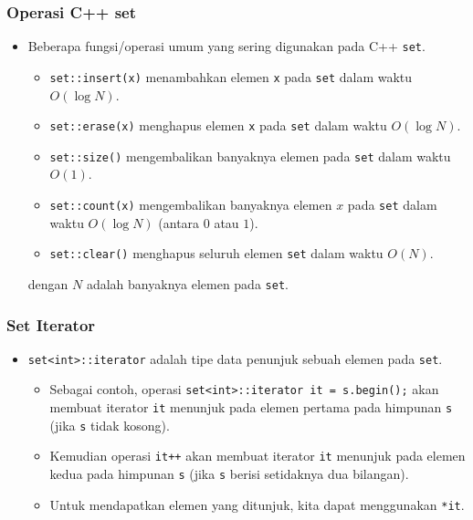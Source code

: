 \begin{frame}
\frametitle{Operasi C++ set}
\begin{itemize}
  \item Beberapa fungsi/operasi umum yang sering digunakan pada C++ \lstinline{set}.
  \begin{itemize}
    \item \lstinline{set::insert(x)} menambahkan elemen \lstinline{x} pada \lstinline{set} dalam waktu $O(\log N)$.
    \item \lstinline{set::erase(x)} menghapus elemen \lstinline{x} pada \lstinline{set} dalam waktu $O(\log N)$.
    \item \lstinline{set::size()} mengembalikan banyaknya elemen pada \lstinline{set} dalam waktu $O(1)$.
    \item \lstinline{set::count(x)} mengembalikan banyaknya elemen $x$ pada \lstinline{set} dalam waktu $O(\log N)$ (antara $0$ atau $1$).
    \item \lstinline{set::clear()} menghapus seluruh elemen \lstinline{set} dalam waktu $O(N)$.
  \end{itemize}
  dengan $N$ adalah banyaknya elemen pada \lstinline{set}.
\end{itemize}
\end{frame}

\begin{frame}
\frametitle{Set Iterator}
\begin{itemize}
  \item \lstinline{set<int>::iterator} adalah tipe data penunjuk sebuah elemen pada \lstinline{set}.
  \begin{itemize}
    \item Sebagai contoh, operasi \lstinline{set<int>::iterator it = s.begin();} akan membuat iterator \lstinline{it} menunjuk pada elemen pertama pada himpunan \lstinline{s} (jika \lstinline{s} tidak kosong).
    \item Kemudian operasi \lstinline{it++} akan membuat iterator \lstinline{it} menunjuk pada elemen kedua pada himpunan \lstinline{s} (jika \lstinline{s} berisi setidaknya dua bilangan).
    \item Untuk mendapatkan elemen yang ditunjuk, kita dapat menggunakan \lstinline{*it}.
  \end{itemize}
\end{itemize}
\end{frame}

